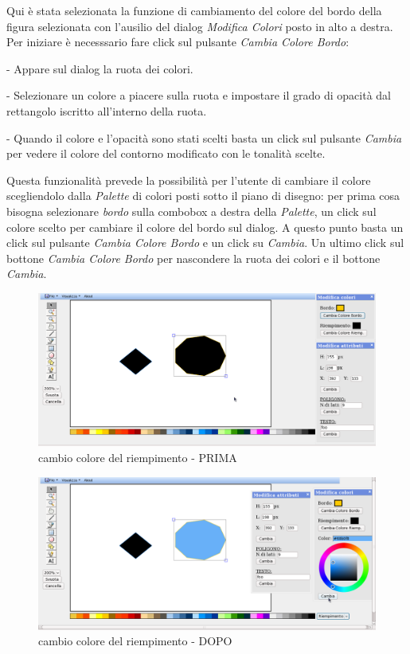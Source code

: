 \vspace{100pt}
Qui \`e stata selezionata la funzione di cambiamento del colore del bordo della figura selezionata con l'ausilio del dialog \textit{Modifica Colori} posto in alto a destra. Per iniziare \`e necesssario fare click sul pulsante \textit{Cambia Colore Bordo}: 
\begin{elencopuntato}[\normindent]
\item[-] Appare sul dialog la ruota dei colori.
\item[-] Selezionare un colore a piacere sulla ruota e impostare il grado di opacit\`a dal rettangolo iscritto all'interno della ruota. 
\item[-]Quando il colore e l'opacit\`a sono stati scelti basta un click sul pulsante \textit{Cambia} per vedere il colore del contorno modificato con le tonalit\`a scelte. 
\end{elencopuntato}
Questa funzionalit\`a prevede la possibilit\`a per l'utente di cambiare il colore scegliendolo dalla \textit{Palette} di colori posti sotto il piano di disegno: per prima cosa bisogna selezionare \textit{bordo} sulla combobox a destra della \textit{Palette}, un click sul colore scelto per cambiare il colore del bordo sul dialog. A questo punto basta un click sul pulsante \textit{Cambia Colore Bordo} e un click su \textit{Cambia}.
Un ultimo click sul bottone \textit{Cambia Colore Bordo} per nascondere la ruota dei colori e il bottone \textit{Cambia}.

\begin{figure}[!ht]
\centering
\includegraphics[scale=0.4]{images/colore_riempimento_prima.png}
\caption{cambio colore del riempimento  - PRIMA}
\end{figure} 

\begin{figure}[!ht]
\centering
\includegraphics[scale=0.4]{images/colore_riempimento_dopo.png}
\caption{cambio colore del riempimento  - DOPO}
\end{figure} 


